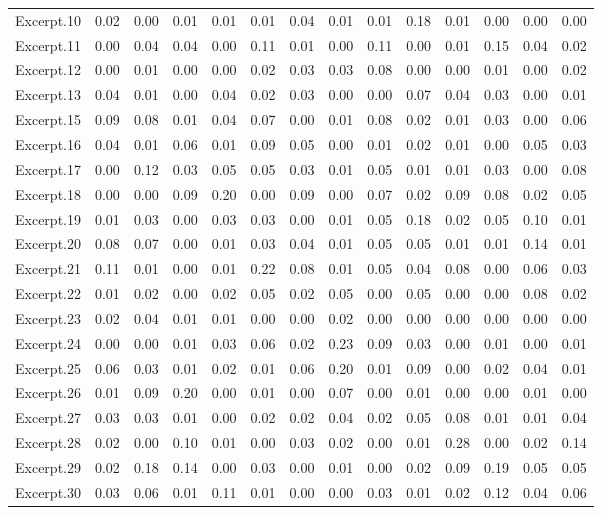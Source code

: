 \documentclass[
]{article}
\newenvironment{lltable}{\begin{landscape}\begin{center}\begin{ThreePartTable}}{\end{ThreePartTable}\end{center}\end{landscape}}
\begin{document}
\begin{lltable}
{\begin{longtable}{llllllllllllll}
Excerpt.10 & 0.02 & 0.00 & 0.01 & 0.01 & 0.01 & 0.04 & 0.01 & 0.01 & 0.18 & 0.01 & 0.00 & 0.00 & 0.00\\
Excerpt.11 & 0.00 & 0.04 & 0.04 & 0.00 & 0.11 & 0.01 & 0.00 & 0.11 & 0.00 & 0.01 & 0.15 & 0.04 & 0.02\\
Excerpt.12 & 0.00 & 0.01 & 0.00 & 0.00 & 0.02 & 0.03 & 0.03 & 0.08 & 0.00 & 0.00 & 0.01 & 0.00 & 0.02\\
Excerpt.13 & 0.04 & 0.01 & 0.00 & 0.04 & 0.02 & 0.03 & 0.00 & 0.00 & 0.07 & 0.04 & 0.03 & 0.00 & 0.01\\
Excerpt.15 & 0.09 & 0.08 & 0.01 & 0.04 & 0.07 & 0.00 & 0.01 & 0.08 & 0.02 & 0.01 & 0.03 & 0.00 & 0.06\\
Excerpt.16 & 0.04 & 0.01 & 0.06 & 0.01 & 0.09 & 0.05 & 0.00 & 0.01 & 0.02 & 0.01 & 0.00 & 0.05 & 0.03\\
Excerpt.17 & 0.00 & 0.12 & 0.03 & 0.05 & 0.05 & 0.03 & 0.01 & 0.05 & 0.01 & 0.01 & 0.03 & 0.00 & 0.08\\
Excerpt.18 & 0.00 & 0.00 & 0.09 & 0.20 & 0.00 & 0.09 & 0.00 & 0.07 & 0.02 & 0.09 & 0.08 & 0.02 & 0.05\\
Excerpt.19 & 0.01 & 0.03 & 0.00 & 0.03 & 0.03 & 0.00 & 0.01 & 0.05 & 0.18 & 0.02 & 0.05 & 0.10 & 0.01\\
Excerpt.20 & 0.08 & 0.07 & 0.00 & 0.01 & 0.03 & 0.04 & 0.01 & 0.05 & 0.05 & 0.01 & 0.01 & 0.14 & 0.01\\
Excerpt.21 & 0.11 & 0.01 & 0.00 & 0.01 & 0.22 & 0.08 & 0.01 & 0.05 & 0.04 & 0.08 & 0.00 & 0.06 & 0.03\\
Excerpt.22 & 0.01 & 0.02 & 0.00 & 0.02 & 0.05 & 0.02 & 0.05 & 0.00 & 0.05 & 0.00 & 0.00 & 0.08 & 0.02\\
Excerpt.23 & 0.02 & 0.04 & 0.01 & 0.01 & 0.00 & 0.00 & 0.02 & 0.00 & 0.00 & 0.00 & 0.00 & 0.00 & 0.00\\
Excerpt.24 & 0.00 & 0.00 & 0.01 & 0.03 & 0.06 & 0.02 & 0.23 & 0.09 & 0.03 & 0.00 & 0.01 & 0.00 & 0.01\\
Excerpt.25 & 0.06 & 0.03 & 0.01 & 0.02 & 0.01 & 0.06 & 0.20 & 0.01 & 0.09 & 0.00 & 0.02 & 0.04 & 0.01\\
Excerpt.26 & 0.01 & 0.09 & 0.20 & 0.00 & 0.01 & 0.00 & 0.07 & 0.00 & 0.01 & 0.00 & 0.00 & 0.01 & 0.00\\
Excerpt.27 & 0.03 & 0.03 & 0.01 & 0.00 & 0.02 & 0.02 & 0.04 & 0.02 & 0.05 & 0.08 & 0.01 & 0.01 & 0.04\\
Excerpt.28 & 0.02 & 0.00 & 0.10 & 0.01 & 0.00 & 0.03 & 0.02 & 0.00 & 0.01 & 0.28 & 0.00 & 0.02 & 0.14\\
Excerpt.29 & 0.02 & 0.18 & 0.14 & 0.00 & 0.03 & 0.00 & 0.01 & 0.00 & 0.02 & 0.09 & 0.19 & 0.05 & 0.05\\
Excerpt.30 & 0.03 & 0.06 & 0.01 & 0.11 & 0.01 & 0.00 & 0.00 & 0.03 & 0.01 & 0.02 & 0.12 & 0.04 & 0.06\\
\bottomrule
\end{longtable}

}

\end{lltable}
\end{document}

